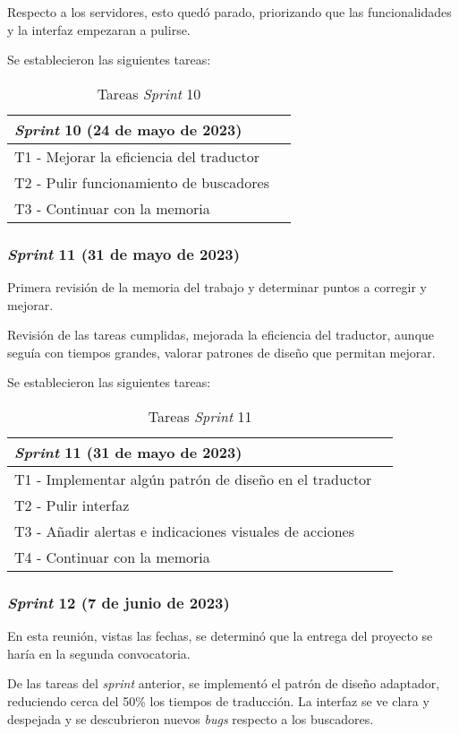Respecto a los servidores, esto quedó parado, priorizando que las funcionalidades y la interfaz empezaran a pulirse.

Se establecieron las siguientes tareas:
\begin{table}[H]
\centering
\begin{tabular}{ll}
\toprule
\textit{Sprint} 10 (24 de mayo de 2023)   \\
\midrule
T1 - Mejorar la eficiencia del traductor\\
T2 - Pulir funcionamiento de buscadores\\
T3 - Continuar con la memoria\\
\bottomrule
\end{tabular}
\caption{Tareas \textit{Sprint} 10}
\end{table}

\subsubsection{\textit{Sprint} 11 (31 de mayo de 2023)}
Primera revisión de la memoria del trabajo y determinar puntos a corregir y mejorar. 

Revisión de las tareas cumplidas, mejorada la eficiencia del traductor, aunque seguía con tiempos grandes, valorar patrones de diseño que permitan mejorar.

Se establecieron las siguientes tareas:
\begin{table}[H]
\centering
\begin{tabular}{ll}
\toprule
\textit{Sprint} 11 (31 de mayo de 2023)   \\
\midrule
T1 - Implementar algún patrón de diseño en el traductor\\
T2 - Pulir interfaz\\
T3 - Añadir alertas e indicaciones visuales de acciones\\
T4 - Continuar con la memoria\\
\bottomrule
\end{tabular}
\caption{Tareas \textit{Sprint} 11}
\end{table}

\subsubsection{\textit{Sprint} 12 (7 de junio de 2023)}
En esta reunión, vistas las fechas, se determinó que la entrega del proyecto se haría en la segunda convocatoria. 

De las tareas del \textit{sprint} anterior, se implementó el patrón de diseño adaptador, reduciendo cerca del 50\% los tiempos de traducción. La interfaz se ve clara y despejada y se descubrieron nuevos \textit{bugs} respecto a los buscadores.

